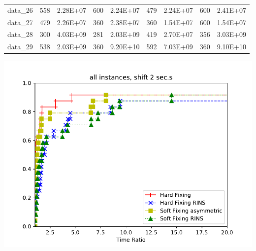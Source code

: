 \begin{table}[!h]
\begin{tabular}{lllllllll}
data\_26 & 558               & 2.28E+07             & 600                                      & 2.24E+07                                     & 479                                         & 2.24E+07                                        & 600                                      & 2.41E+07                                     \\
data\_27 & 479               & 2.26E+07             & 360                                      & 2.38E+07                                     & 360                                         & 1.54E+07                                        & 600                                      & 1.54E+07                                     \\
data\_28 & 300               & 4.03E+09             & 281                                      & 2.03E+09                                     & 419                                         & 2.70E+07                                        & 356                                      & 3.03E+09                                     \\
data\_29 & 538               & 2.03E+09             & 360                                      & 9.20E+10                                     & 592                                         & 7.03E+09                                        & 360                                      & 9.10E+10                                     \\ \hline
\end{tabular}
\end{table}

\begin{center}
	\includegraphics[scale=0.7]{Graphics/Matheuristic.pdf}
	\label{img:mathperfprof3}
\end{center}
